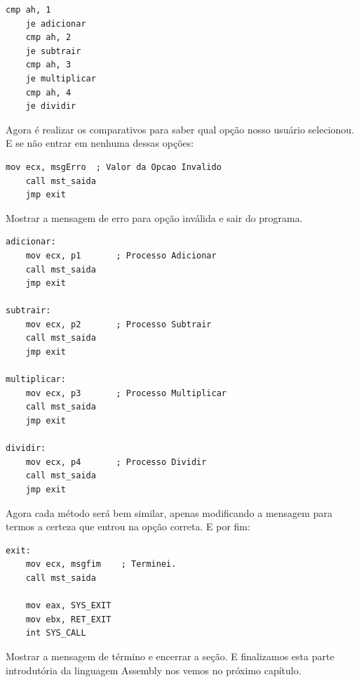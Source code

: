 \begin{lstlisting}[]
	cmp ah, 1
	je adicionar
	cmp ah, 2
	je subtrair
	cmp ah, 3
	je multiplicar
	cmp ah, 4
	je dividir
\end{lstlisting}

Agora é realizar os comparativos para saber qual opção nosso usuário selecionou. E se não entrar em nenhuma dessas opções:

\begin{lstlisting}[]
	mov ecx, msgErro  ; Valor da Opcao Invalido
	call mst_saida
	jmp exit
\end{lstlisting}

Mostrar a mensagem de erro para opção inválida e sair do programa.

\begin{lstlisting}[]
adicionar:
	mov ecx, p1       ; Processo Adicionar
	call mst_saida
	jmp exit

subtrair:
	mov ecx, p2       ; Processo Subtrair
	call mst_saida
	jmp exit

multiplicar:
	mov ecx, p3       ; Processo Multiplicar
	call mst_saida
	jmp exit

dividir:
	mov ecx, p4       ; Processo Dividir
	call mst_saida
	jmp exit
\end{lstlisting}

Agora cada método será bem similar, apenas modificando a mensagem para termos a certeza que entrou na opção correta. E por fim:
\begin{lstlisting}[]
exit:
	mov ecx, msgfim    ; Terminei.
	call mst_saida

	mov eax, SYS_EXIT
	mov ebx, RET_EXIT
	int SYS_CALL
\end{lstlisting}

Mostrar a mensagem de término e encerrar a seção. E finalizamos esta parte introdutória da linguagem Assembly nos vemos no próximo capítulo.

\clearpage